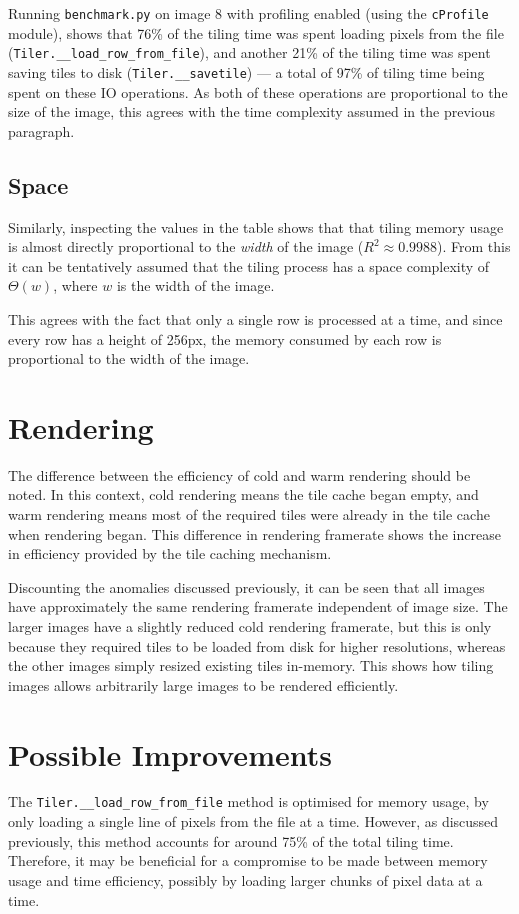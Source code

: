 \documentclass{report}
\begin{document}
  Running \texttt{benchmark.py} on image 8 with profiling enabled (using the
  \texttt{cProfile} module), shows that 76\% of the tiling time was spent
  loading pixels from the file (\texttt{Tiler.\_\_load\_row\_from\_file}), and
  another 21\% of the tiling time was spent saving tiles to disk
  (\texttt{Tiler.\_\_savetile}) --- a total of 97\% of tiling time being spent
  on these IO operations. As both of these operations are proportional to the
  size of the image, this agrees with the time complexity assumed in the
  previous paragraph.

  \subsection{Space}
  Similarly, inspecting the values in the table shows that that tiling memory
  usage is almost directly proportional to the \emph{width} of the image
  ($R^2\approx0.9988$). From this it can be tentatively assumed that the tiling
  process has a space complexity of $\Theta(w)$, where $w$ is the width of the
  image.

  This agrees with the fact that only a single row is processed at a time, and
  since every row has a height of 256px, the memory consumed by each row is
  proportional to the width of the image.

  \section{Rendering}
  The difference between the efficiency of cold and warm rendering should
  be noted. In this context, cold rendering means the tile cache began empty,
  and warm rendering means most of the required tiles were already in the tile
  cache when rendering began. This difference in rendering framerate shows the
  increase in efficiency provided by the tile caching mechanism.

  Discounting the anomalies discussed previously, it can be seen that all
  images have approximately the same rendering framerate independent of image
  size. The larger images have a slightly reduced cold rendering framerate, but
  this is only because they required tiles to be loaded from disk for higher
  resolutions, whereas the other images simply resized existing tiles
  in-memory. This shows how tiling images allows arbitrarily large images to be
  rendered efficiently.

  \section{Possible Improvements}
  The \texttt{Tiler.\_\_load\_row\_from\_file} method is optimised for memory
  usage, by only loading a single line of pixels from the file at a time.
  However, as discussed previously, this method accounts for around 75\% of the
  total tiling time. Therefore, it may be beneficial for a compromise to be
  made between memory usage and time efficiency, possibly by loading larger
  chunks of pixel data at a time.
\end{document}
